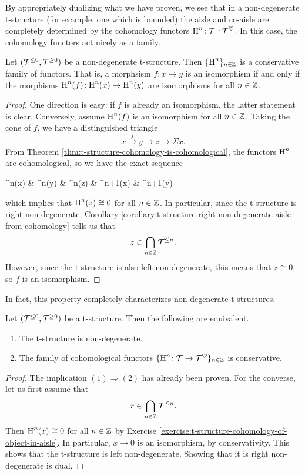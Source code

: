 By appropriately dualizing what we have proven, we see that in a non-degenerate t-structure (for example, one which is bounded) the aisle and co-aisle are completely
determined by the cohomology functors \(\operatorname{H}^n\!:\mathcal{T}^\to\mathcal{T}^\heartsuit\). In this case, the cohomology functors act nicely as a family.
\begin{proposition}
	Let \((\mathcal{T}^{\leq 0},\mathcal{T}^{\geq 0})\) be a non-degenerate t-structure. Then \(\{\operatorname{H}^n\}_{n\in\mathbb{Z}}\) is a conservative family of functors. That is, a morphsism \(f\!:x\to y\)
	is an isomorphism if and only if the morphisms \(\operatorname{H}^n(f)\!:\operatorname{H}^n(x)\to\operatorname{H}^n(y)\) are isomorphisms for all \(n\in\mathbb{Z}\).
\end{proposition}
\begin{proof}
One direction is easy: if \(f\) is already an isomorphism, the latter statement is clear. Conversely, assume \(\operatorname{H}^n(f)\) is an isomorphism for all \(n\in\mathbb{Z}\). Taking the cone of \(f\),
we have a distinguished triangle
\[ x \overset{f}\to y \to z \to \Sigma x. \]
From Theorem \ref{thm:t-structure-cohomology-is-cohomological}, the functors \(\operatorname{H}^n\) are cohomological, so we have the exact sequence
\begin{diagram*}
	\HH^n(x) \ar[r,"\sim","\HH^n(f)"'] & \HH^n(y) \ar[r] & \HH^n(z) \ar[r] & \HH^{n+1}(x) \ar[r,"\sim","\HH^{n+1}(f)"'] & \HH^{n+1}(y)
\end{diagram*}
which implies that \(\operatorname{H}^n(z)\cong 0\) for all \(n\in\mathbb{Z}\). In particular, since the t-structure is right non-degenerate, Corollary \ref{corollary:t-structure-right-non-degenerate-aisle-from-cohomology} tells us that
\[ z \in \bigcap_{n\in\mathbb{Z}}\mathcal{T}^{\leq n}. \]
However, since the t-structure is also left non-degenerate, this means that \(z\cong 0\), so \(f\) is an isomorphism.
\end{proof}

In fact, this property completely characterizes non-degenerate t-structures.
\begin{theorem}
	Let \((\mathcal{T}^{\leq 0},\mathcal{T}^{\geq 0})\) be a t-structure. Then the following are equivalent.
	\begin{enumerate}[label=(\arabic*)]
		\item The t-structure is non-degenerate.
		\item The family of cohomological functors \(\{\operatorname{H}^n\!:\mathcal{T}\to\mathcal{T}^{\heartsuit}\}_{n\in\mathbb{Z}}\) is conservative.
	\end{enumerate}
\end{theorem}
\begin{proof}
The implication \((1)\Rightarrow(2)\) has already been proven. For the converse, let us first assume that
\[ x \in\bigcap_{n\in\mathbb{Z}}\mathcal{T}^{\leq n}. \]
Then \(\operatorname{H}^n(x)\cong 0\) for all \(n\in\mathbb{Z}\) by Exercise \ref{exercise:t-structure-cohomology-of-object-in-aisle}. In particular, \(x \to 0\) is an isomorphism, by conservativity. This shows
that the t-structure is left non-degenerate. Showing that it is right non-degenerate is dual.
\end{proof}

